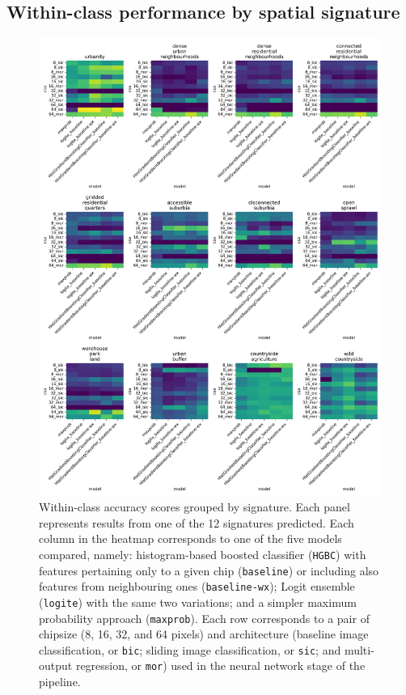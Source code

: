 \documentclass[]{interact}
\theoremstyle{plain}%
\theoremstyle{definition}
\theoremstyle{remark}
\begin{document}
\pagebreak

\subsection{Within-class performance by spatial signature}
\label{sec:appendixB}

\begin{figure}
    \centering
    \includegraphics[width=0.8\linewidth]{fig/wc_accuracy_x_signature.png}
    \caption{Within-class accuracy scores grouped by signature. Each panel
    represents results from one of the 12 signatures predicted. Each column in
    the heatmap
    corresponds to one of the five models compared, namely:
    histogram-based boosted classifier (\texttt{HGBC}) with features
    pertaining only to a given chip (\texttt{baseline}) or including also features
    from neighbouring ones (\texttt{baseline-wx}); Logit ensemble
    (\texttt{logite}) with the same two variations; and a simpler maximum
    probability approach (\texttt{maxprob}). Each row
    corresponds to a pair of chipsize (8, 16, 32, and 64 pixels)
    and architecture (baseline image classification, or \texttt{bic}; sliding
            image classification, or \texttt{sic}; and multi-output
    regression, or \texttt{mor}) used in the neural network stage of the
    pipeline.}
    \label{fig:wc_accuracy_x_signature}
\end{figure}
\end{document}
